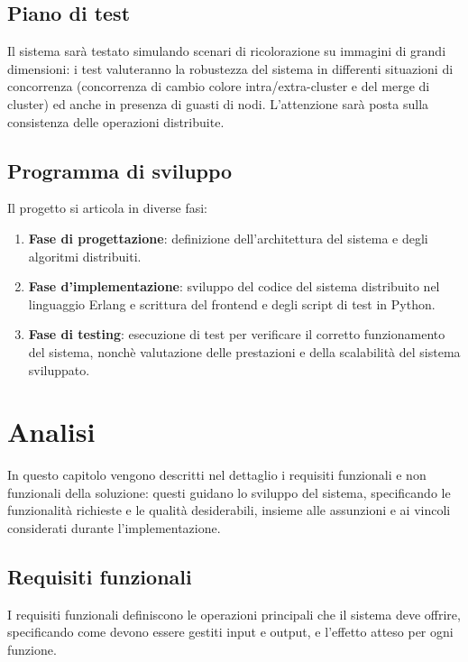 \documentclass[12pt, a4paper]{report}
\begin{document}
\section{Piano di test}

Il sistema sar\`a testato simulando scenari di ricolorazione su immagini di grandi dimensioni: i test valuteranno la robustezza del sistema in differenti situazioni di concorrenza (concorrenza di cambio colore intra/extra-cluster e del merge di cluster) ed anche in presenza di guasti di nodi. L'attenzione sar\`a posta sulla consistenza delle operazioni distribuite.

\section{Programma di sviluppo}

Il progetto si articola in diverse fasi:
\begin{enumerate}
    \item \textbf{Fase di progettazione}: definizione dell'architettura del sistema e degli algoritmi distribuiti.
    \item \textbf{Fase d'implementazione}: sviluppo del codice del sistema distribuito nel linguaggio Erlang e scrittura del frontend e degli script di test in Python.
    \item \textbf{Fase di testing}: esecuzione di test per verificare il corretto funzionamento del sistema, nonch\`e valutazione delle prestazioni e della scalabilit\`a del sistema sviluppato.
\end{enumerate}

\chapter{Analisi}\label{chapter:analisi}

In questo capitolo vengono descritti nel dettaglio i requisiti funzionali e non funzionali della soluzione: questi guidano lo sviluppo del sistema, specificando le funzionalit\`a richieste e le qualit\`a desiderabili, insieme alle assunzioni e ai vincoli considerati durante l'implementazione.

\section{Requisiti funzionali}

I requisiti funzionali definiscono le operazioni principali che il sistema deve offrire, specificando come devono essere gestiti input e output, e l'effetto atteso per ogni funzione.
\end{document}
